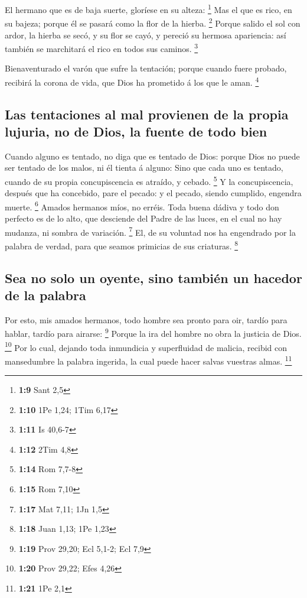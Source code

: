  El hermano que es de baja suerte, gloríese en su alteza:
\footnote{\textbf{1:9} Sant 2,5}  Mas el que es rico, en su
bajeza; porque él se pasará como la flor de la hierba. \footnote{\textbf{1:10}
  1Pe 1,24; 1Tim 6,17}  Porque salido el sol con ardor, la
hierba se secó, y su flor se cayó, y pereció su hermosa apariencia: así
también se marchitará el rico en todos sus caminos. \footnote{\textbf{1:11}
  Is 40,6-7}

 Bienaventurado el varón que sufre la tentación; porque
cuando fuere probado, recibirá la corona de vida, que Dios ha prometido
á los que le aman. \footnote{\textbf{1:12} 2Tim 4,8}

\hypertarget{las-tentaciones-al-mal-provienen-de-la-propia-lujuria-no-de-dios-la-fuente-de-todo-bien}{%
\subsection{Las tentaciones al mal provienen de la propia lujuria, no de
Dios, la fuente de todo
bien}\label{las-tentaciones-al-mal-provienen-de-la-propia-lujuria-no-de-dios-la-fuente-de-todo-bien}}

 Cuando alguno es tentado, no diga que es tentado de Dios:
porque Dios no puede ser tentado de los malos, ni él tienta á alguno:
 Sino que cada uno es tentado, cuando de su propia
concupiscencia es atraído, y cebado. \footnote{\textbf{1:14} Rom 7,7-8}
 Y la concupiscencia, después que ha concebido, pare el
pecado: y el pecado, siendo cumplido, engendra muerte. \footnote{\textbf{1:15}
  Rom 7,10}  Amados hermanos míos, no erréis. 
Toda buena dádiva y todo don perfecto es de lo alto, que desciende del
Padre de las luces, en el cual no hay mudanza, ni sombra de variación.
\footnote{\textbf{1:17} Mat 7,11; 1Jn 1,5}  El, de su
voluntad nos ha engendrado por la palabra de verdad, para que seamos
primicias de sus criaturas. \footnote{\textbf{1:18} Juan 1,13; 1Pe 1,23}

\hypertarget{sea-no-solo-un-oyente-sino-tambiuxe9n-un-hacedor-de-la-palabra}{%
\subsection{Sea no solo un oyente, sino también un hacedor de la
palabra}\label{sea-no-solo-un-oyente-sino-tambiuxe9n-un-hacedor-de-la-palabra}}

 Por esto, mis amados hermanos, todo hombre sea pronto para
oir, tardío para hablar, tardío para airarse: \footnote{\textbf{1:19}
  Prov 29,20; Ecl 5,1-2; Ecl 7,9}  Porque la ira del hombre
no obra la justicia de Dios. \footnote{\textbf{1:20} Prov 29,22; Efes
  4,26}  Por lo cual, dejando toda inmundicia y
superfluidad de malicia, recibid con mansedumbre la palabra ingerida, la
cual puede hacer salvas vuestras almas. \footnote{\textbf{1:21} 1Pe 2,1}

